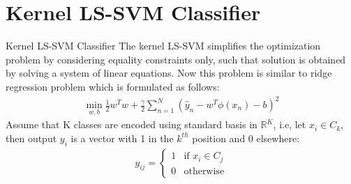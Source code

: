 \documentclass{beamer}
\begin{document}

\section{Kernel LS-SVM Classifier}
\begin{frame}{Kernel LS-SVM Classifier}
    The kernel LS-SVM simplifies the optimization problem by
    considering equality constraints only, such that solution is obtained by solving a system of linear equations.
    Now this problem is similar to ridge regression problem which is formulated as follows:
    \begin{align}
        \min_{w,b} \frac{1}{2}w^{T}w + \frac{\gamma}{2}\sum_{n=1}^{N}(\hat{y}_{n} - w^{T}\phi(x_{n}) - b)^{2}
    \end{align}
     Assume that K classes are encoded using standard basis in $\mathbb{R}^{K}$, i.e, let $x_{i} \in C_{k}$, then output
    $ y_{i}$ is a vector with 1 in the $k^{th}$ position and 0 elsewhere:
    \begin{align}
        y_{ij} = \begin{cases}
                     1 & \text{if } x_{i} \in C_{j} \\
                     0 & \text{otherwise}
        \end{cases}
    \end{align}
\end{frame}
\end{document}
